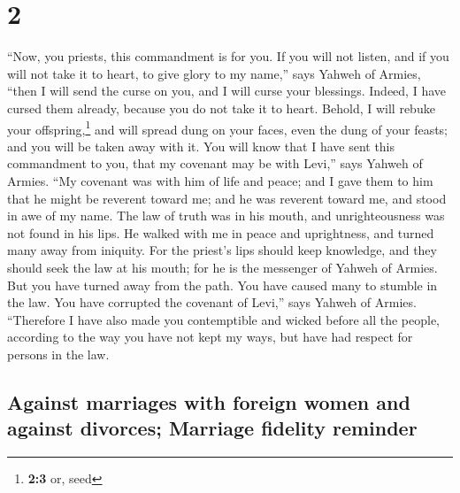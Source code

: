 \hypertarget{section-1}{%
\section{2}\label{section-1}}

 ``Now, you priests, this commandment is for you.
 If you will not listen, and if you will not take it to
heart, to give glory to my name,'' says Yahweh of Armies, ``then I will
send the curse on you, and I will curse your blessings. Indeed, I have
cursed them already, because you do not take it to heart. 
Behold, I will rebuke your offspring,\footnote{\textbf{2:3} or, seed}
and will spread dung on your faces, even the dung of your feasts; and
you will be taken away with it.  You will know that I have
sent this commandment to you, that my covenant may be with Levi,'' says
Yahweh of Armies.  ``My covenant was with him of life and
peace; and I gave them to him that he might be reverent toward me; and
he was reverent toward me, and stood in awe of my name. 
The law of truth was in his mouth, and unrighteousness was not found in
his lips. He walked with me in peace and uprightness, and turned many
away from iniquity.  For the priest's lips should keep
knowledge, and they should seek the law at his mouth; for he is the
messenger of Yahweh of Armies.  But you have turned away
from the path. You have caused many to stumble in the law. You have
corrupted the covenant of Levi,'' says Yahweh of Armies. 
``Therefore I have also made you contemptible and wicked before all the
people, according to the way you have not kept my ways, but have had
respect for persons in the law.

\hypertarget{against-marriages-with-foreign-women-and-against-divorces-marriage-fidelity-reminder}{%
\subsection{Against marriages with foreign women and against divorces;
Marriage fidelity
reminder}\label{against-marriages-with-foreign-women-and-against-divorces-marriage-fidelity-reminder}}

